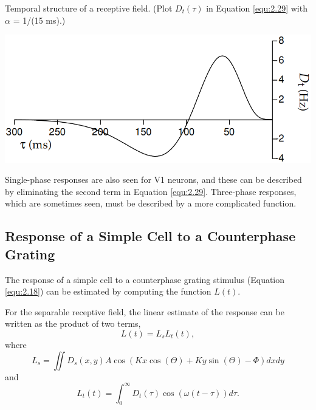\begin{exm}
  Temporal structure of a receptive field. (Plot $D_t(\tau)$ in Equation \ref{equ:2.29} with $\alpha$ = 1/(15 ms).)
  \begin{center}
    \includegraphics[scale=0.25]{./png/temporalReceptiveField}
  \end{center}
\end{exm}

\begin{rem}
  Single-phase responses are also seen for V1 neurons, and these can be described by eliminating the second term in Equation \ref{equ:2.29}. Three-phase responses, which are sometimes seen, must be described by a more complicated function.
\end{rem}

\subsection{Response of a Simple Cell to a Counterphase Grating}
\label{sec:ResponseOfSimpleCelltoCounterphaseGrating}

\begin{rem}
  The response of a simple cell to a counterphase grating stimulus (Equation \ref{equ:2.18}) can be estimated by computing the function $L(t)$.
\end{rem}

\begin{prop}
  For the separable receptive field, the linear estimate of the response can be written as the product of two terms,
  \begin{equation}
    \label{equ:2.30}
    L(t) = L_sL_t(t),
  \end{equation}
  where
  \begin{equation}
    \label{equ:2.31}
    L_s = \iint D_s(x,y)A\cos\left( Kx\cos(\Theta)+Ky\sin(\Theta)-\Phi\right) dxdy
  \end{equation}
  and
  \begin{equation}
    \label{equ:2.32}
    L_t(t) = \int_0^{\infty}D_t(\tau)\cos(\omega(t-\tau))d\tau.
  \end{equation}
\end{prop}

